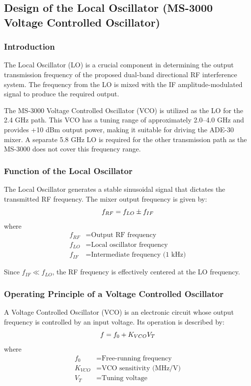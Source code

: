 \documentclass[12pt,a4paper]{report}
\begin{document}
	\subsection{Design of the Local Oscillator (MS-3000 Voltage Controlled Oscillator)}
	
	\subsubsection{Introduction}
	The Local Oscillator (LO) is a crucial component in determining the output transmission frequency of the proposed dual-band directional RF interference system. The frequency from the LO is mixed with the IF amplitude-modulated signal to produce the required output.
	
	The MS-3000 Voltage Controlled Oscillator (VCO) is utilized as the LO for the 2.4 GHz path. This VCO has a tuning range of approximately 2.0--4.0 GHz and provides +10 dBm output power, making it suitable for driving the ADE-30 mixer. A separate 5.8 GHz LO is required for the other transmission path as the MS-3000 does not cover this frequency range.
	\subsubsection{Function of the Local Oscillator}
	The Local Oscillator generates a stable sinusoidal signal that dictates the transmitted RF frequency. The mixer output frequency is given by:
	\begingroup
	\setlength{\mathindent}{0pt}
	\begin{equation*}
		\hfill
		f_{RF} = f_{LO} \pm f_{IF}
		\hfill
	\end{equation*}
	\endgroup
	where
	\begin{align*}
		f_{RF} &= \text{Output RF frequency} \\
		f_{LO} &= \text{Local oscillator frequency} \\
		f_{IF} &= \text{Intermediate frequency (1 kHz)}
	\end{align*}
	
	Since $f_{IF} \ll f_{LO}$, the RF frequency is effectively centered at the LO frequency.
	

	

	\subsubsection{Operating Principle of a Voltage Controlled Oscillator}
	A Voltage Controlled Oscillator (VCO) is an electronic circuit whose output frequency is controlled by an input voltage. Its operation is described by:
\begingroup
\setlength{\mathindent}{0pt}
\begin{equation*}
	\hfill
	f = f_0 + K_{VCO} V_T
	\hfill
\end{equation*}
\endgroup
where
\begin{align*}
	f_0 &= \text{Free-running frequency} \\
	K_{VCO} &= \text{VCO sensitivity (MHz/V)} \\
	V_T &= \text{Tuning voltage}
\end{align*}
\end{document}
